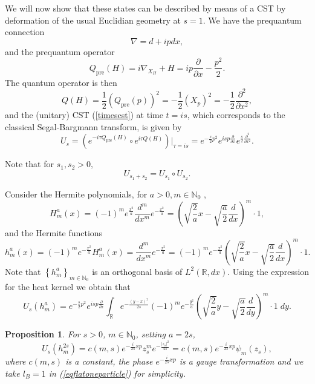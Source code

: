 \documentclass[a4paper,11pt]{article}
\newtheorem{proposition}{Proposition}
\begin{document}
\begin{appendices}
We will now show that these states can be described by means of a CST by deformation of the usual Euclidian geometry at $s=1$.
We have the prequantum connection 
$$
\nabla = d + i pdx,
$$
and the prequantum operator
$$
Q_{\mathrm{pre}} (H) = i\nabla_{X_H} + H = i p\frac{\partial}{\partial x} -\frac{p^2}{2}. 
$$
The quantum operator is then
$$
Q(H) = \frac12 (Q_{\mathrm{pre}}(p))^2 = -\frac12 (X_p)^2 = -\frac12 \frac{\partial^2}{\partial x^2},
$$
and the (unitary) CST (\ref{timescst}) at time $t = is$, which corresponds to the classical Segal-Bargmann transform, is given by 
\begin{equation}\label{flatplanecst}
U_{s} = \left(e^{-i \tau Q_{\mathrm{pre}}(H)}\circ e^{i \tau Q(H)}\right)\bigg|_{\tau=is} = 
e^{-\frac{s}{2}p^2} e^{isp\frac{\partial}{\partial x}} e^{\frac{s}{2}\frac{\partial ^2}{\partial x^2}}.
\end{equation}

Note that for $s_1,s_2 >0,$ 
\begin{equation}\label{transitive}
    U_{s_1+s_2} = U_{s_1}\circ U_{s_2}.
\end{equation}

Consider the Hermite polynomials, for $a >0, m\in \mathbb{N}_0$ \cite{Hall00, Ab},
$$
H_m^a(x) = (-1)^m e^{\frac{x^2}{a}} \frac{d^m}{dx^m} e^{-\frac{x^2}{a}} = 
\left( \sqrt{\frac{2}{a}}x-\sqrt{\frac{a}{2}}\frac{d}{dx}\right)^m\cdot 1,
$$
and the Hermite functions 
$$
h_m^a(x) = (-1)^m e^{-\frac{x^2}{a}} H_m^a (x) = \frac{d^m}{dx^m}e^{-\frac{x^2}{a}} =
(-1)^m e^{-\frac{x^2}{a}} \left( \sqrt{\frac{2}{a}}x-\sqrt{\frac{a}{2}}\frac{d}{dx}\right)^m\cdot 1.
$$
Note that $\left\{ h_m^a\right\}_{m\in \mathbb{N}_0}$ is an orthogonal basis of $L^2(\mathbb{R},dx)$.
Using the expression for the heat kernel we obtain that
$$
U_s \left( h_m^a\right) = e^{-\frac{s}{2}p^2} e^{isp\frac{\partial}{\partial x}}\int_{\mathbb{R}} e^{-\frac{(y-x)^2}{2s}} (-1)^m e^{-\frac{y^2}{a}} 
\left( \sqrt{\frac{2}{a}}y-\sqrt{\frac{a}{2}}\frac{d}{dy}\right)^m\cdot 1 \; dy.
$$



\begin{proposition}\label{hermiteprop}For $s>0$, $m\in \mathbb{N}_0$, setting $a=2s$,
$$
    U_s \left(h_m^{2s}\right) = c(m,s)  e^{-\frac{i}{2s}xp}z_s^m e^{-\frac{\vert z_s\vert^2}{4s}} = c(m,s) e^{-\frac{i}{2s}xp} \psi_m (z_s), 
$$
where $c(m,s)$ is a constant, the phase $e^{-\frac{i}{2s}xp}$ is a gauge transformation and we take $l_B=1$ in (\ref{eqflatoneparticle}) for simplicity.
\end{proposition}


\end{appendices}
\end{document}
